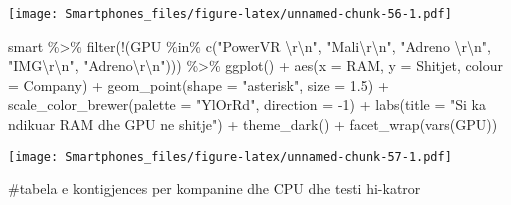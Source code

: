 \documentclass[
]{article}
\newenvironment{Shaded}{\begin{snugshade}}{\end{snugshade}}
\newcommand{\AttributeTok}[1]{\textcolor[rgb]{0.77,0.63,0.00}{#1}}
\newcommand{\DecValTok}[1]{\textcolor[rgb]{0.00,0.00,0.81}{#1}}
\newcommand{\FloatTok}[1]{\textcolor[rgb]{0.00,0.00,0.81}{#1}}
\newcommand{\FunctionTok}[1]{\textcolor[rgb]{0.00,0.00,0.00}{#1}}
\newcommand{\NormalTok}[1]{#1}
\newcommand{\SpecialCharTok}[1]{\textcolor[rgb]{0.00,0.00,0.00}{#1}}
\newcommand{\StringTok}[1]{\textcolor[rgb]{0.31,0.60,0.02}{#1}}
\begin{document}
\texttt{[image: Smartphones\_files/figure-latex/unnamed-chunk-56-1.pdf]}

\begin{Shaded}
\begin{Highlighting}[]
\NormalTok{smart }\SpecialCharTok{\%\textgreater{}\%}
 \FunctionTok{filter}\NormalTok{(}\SpecialCharTok{!}\NormalTok{(GPU }\SpecialCharTok{\%in\%} \FunctionTok{c}\NormalTok{(}\StringTok{"PowerVR }\SpecialCharTok{\textbackslash{}r\textbackslash{}n}\StringTok{"}\NormalTok{, }\StringTok{"Mali}\SpecialCharTok{\textbackslash{}r\textbackslash{}n}\StringTok{"}\NormalTok{, }\StringTok{"Adreno }\SpecialCharTok{\textbackslash{}r\textbackslash{}n}\StringTok{"}\NormalTok{, }\StringTok{"IMG}\SpecialCharTok{\textbackslash{}r\textbackslash{}n}\StringTok{"}\NormalTok{, }\StringTok{"Adreno}\SpecialCharTok{\textbackslash{}r\textbackslash{}n}\StringTok{"}\NormalTok{))) }\SpecialCharTok{\%\textgreater{}\%}
 \FunctionTok{ggplot}\NormalTok{() }\SpecialCharTok{+}
  \FunctionTok{aes}\NormalTok{(}\AttributeTok{x =}\NormalTok{ RAM, }\AttributeTok{y =}\NormalTok{ Shitjet, }\AttributeTok{colour =}\NormalTok{ Company) }\SpecialCharTok{+}
  \FunctionTok{geom\_point}\NormalTok{(}\AttributeTok{shape =} \StringTok{"asterisk"}\NormalTok{, }\AttributeTok{size =} \FloatTok{1.5}\NormalTok{) }\SpecialCharTok{+}
  \FunctionTok{scale\_color\_brewer}\NormalTok{(}\AttributeTok{palette =} \StringTok{"YlOrRd"}\NormalTok{, }\AttributeTok{direction =} \SpecialCharTok{{-}}\DecValTok{1}\NormalTok{) }\SpecialCharTok{+}
  \FunctionTok{labs}\NormalTok{(}\AttributeTok{title =} \StringTok{"Si ka ndikuar RAM dhe GPU ne shitje"}\NormalTok{) }\SpecialCharTok{+}
  \FunctionTok{theme\_dark}\NormalTok{() }\SpecialCharTok{+}
  \FunctionTok{facet\_wrap}\NormalTok{(}\FunctionTok{vars}\NormalTok{(GPU))}
\end{Highlighting}
\end{Shaded}

\texttt{[image: Smartphones\_files/figure-latex/unnamed-chunk-57-1.pdf]}

\#tabela e kontigjences per kompanine dhe CPU dhe testi hi-katror

\begin{Shaded}
\end{Shaded}
\end{document}
